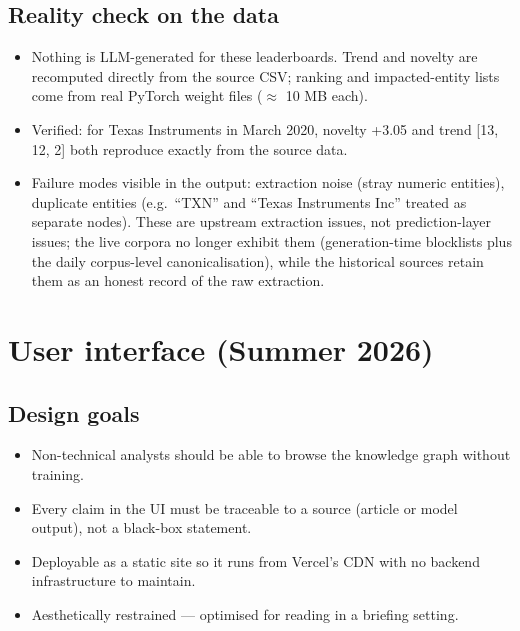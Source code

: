 \documentclass[11pt]{article}
\begin{document}
\subsection{Reality check on the data}
\begin{itemize}
  \item Nothing is LLM-generated for these leaderboards. Trend and novelty are recomputed directly from the source CSV; ranking and impacted-entity lists come from real PyTorch weight files (\(\approx\) 10 MB each).
  \item Verified: for Texas Instruments in March 2020, novelty +3.05 and trend [13, 12, 2] both reproduce exactly from the source data.
  \item Failure modes visible in the output: extraction noise (stray numeric entities), duplicate entities (e.g.\ ``TXN'' and ``Texas Instruments Inc'' treated as separate nodes). These are upstream extraction issues, not prediction-layer issues; the live corpora no longer exhibit them (generation-time blocklists plus the daily corpus-level canonicalisation), while the historical sources retain them as an honest record of the raw extraction.
\end{itemize}

\section{User interface (Summer 2026)}
\label{sec:ui}

\subsection{Design goals}
\begin{itemize}
  \item Non-technical analysts should be able to browse the knowledge graph without training.
  \item Every claim in the UI must be traceable to a source (article or model output), not a black-box statement.
  \item Deployable as a static site so it runs from Vercel's CDN with no backend infrastructure to maintain.
  \item Aesthetically restrained --- optimised for reading in a briefing setting.
\end{itemize}
\end{document}
